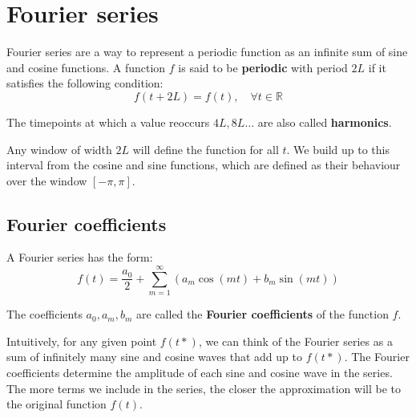 \chapter{Fourier series}

Fourier series are a way to represent a periodic function as an infinite sum of sine and cosine functions. A function $f$ is said to be \textbf{periodic} with period $2L$ if it satisfies the following condition:
\begin{equation*}
f(t+2L) = f(t), \quad \forall t \in \mathbb{R}
\end{equation*}

The timepoints at which a value reoccurs $4L, 8L \ldots$ are also called \textbf{harmonics}.

Any window of width $2L$ will define the function for all $t$. We build up to this interval from the cosine and sine functions, which are defined as their behaviour over the window $\left[ - \pi , \pi \right]$.


\section{Fourier coefficients}
A Fourier series has the form:
\begin{equation*}
\boxed{
    f(t) = \frac{a_0}{2} + \sum_{m=1}^{\infty} \left( a_m \cos \left( mt \right) + b_m \sin \left( mt \right) \right)
}
\end{equation*}

The coefficients $a_0, a_m, b_m$ are called the \textbf{Fourier coefficients} of the function $f$.

Intuitively, for any given point $f(t*)$, we can think of the Fourier series as a sum of infinitely many sine and cosine waves that add up to $f(t*)$. The Fourier coefficients determine the amplitude of each sine and cosine wave in the series. The more terms we include in the series, the closer the approximation will be to the original function $f(t)$.

